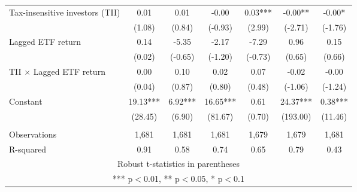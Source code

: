 \documentclass[]{article}
\begin{document}
\begin{tabular}{lcccccc}
Tax-insensitive investors (TII) & 0.01 & 0.01 & -0.00 & 0.03*** & -0.00** & -0.00* \\
 & (1.08) & (0.84) & (-0.93) & (2.99) & (-2.71) & (-1.76) \\
Lagged ETF return & 0.14 & -5.35 & -2.17 & -7.29 & 0.96 & 0.15 \\
 & (0.02) & (-0.65) & (-1.20) & (-0.73) & (0.65) & (0.66) \\
TII $\times$ Lagged ETF return & 0.00 & 0.10 & 0.02 & 0.07 & -0.02 & -0.00 \\
 & (0.04) & (0.87) & (0.80) & (0.48) & (-1.06) & (-1.24) \\
Constant & 19.13*** & 6.92*** & 16.65*** & 0.61 & 24.37*** & 0.38*** \\
 & (28.45) & (6.90) & (81.67) & (0.70) & (193.00) & (11.46) \\
 &  &  &  &  &  &  \\
Observations & 1,681 & 1,681 & 1,681 & 1,679 & 1,679 & 1,681 \\
 R-squared & 0.91 & 0.58 & 0.74 & 0.65 & 0.79 & 0.43 \\ \hline
\multicolumn{7}{c}{ Robust t-statistics in parentheses} \\
\multicolumn{7}{c}{ *** p$<$0.01, ** p$<$0.05, * p$<$0.1} \\
\end{tabular}
\end{document}
